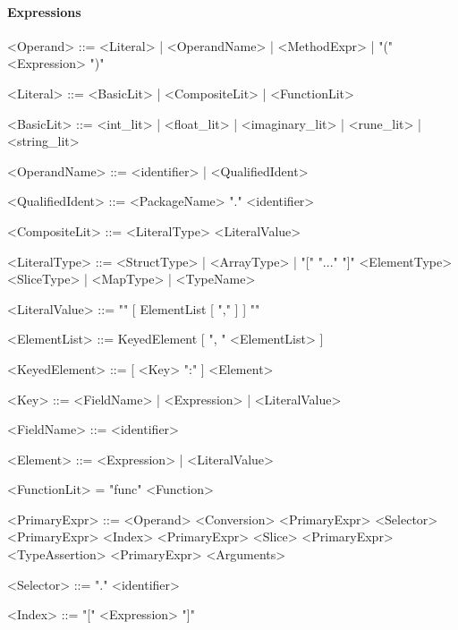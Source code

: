 \documentclass{article}
\begin{document}
    \paragraph{Expressions}

    \begin{grammar}

        <Operand>           ::= <Literal> | <OperandName> | <MethodExpr> | "(" <Expression> ")"

        <Literal>           ::= <BasicLit> | <CompositeLit> | <FunctionLit>

        <BasicLit>          ::= <int_lit> | <float_lit> | <imaginary_lit> | <rune_lit> | <string_lit>

        <OperandName>       ::= <identifier> | <QualifiedIdent>

        <QualifiedIdent>    ::= <PackageName> "." <identifier>

        <CompositeLit>      ::=     <LiteralType> <LiteralValue>

        <LiteralType>       ::=     <StructType> | <ArrayType> | "[" "..." "]" <ElementType>
                            \alt    <SliceType> | <MapType> | <TypeName>

        <LiteralValue>      ::=     "{" [ ElementList [ "," ] ] "}"

        <ElementList>       ::=     KeyedElement [ ", " <ElementList> ]

        <KeyedElement>      ::=     [ <Key> ":" ] <Element>

        <Key>               ::=     <FieldName> | <Expression> | <LiteralValue>

        <FieldName>         ::=     <identifier>

        <Element>           ::=     <Expression> | <LiteralValue>

        <FunctionLit> = "func" <Function>

        <PrimaryExpr>         ::=     <Operand>
                            \alt    <Conversion>
                            \alt    <PrimaryExpr> <Selector>
                            \alt    <PrimaryExpr> <Index>
                            \alt    <PrimaryExpr> <Slice>
                            \alt    <PrimaryExpr> <TypeAssertion>
                            \alt    <PrimaryExpr> <Arguments>

        <Selector>          ::=     "." <identifier>

        <Index>             ::=     "[" <Expression> "]"


\end{grammar}
\end{document}

